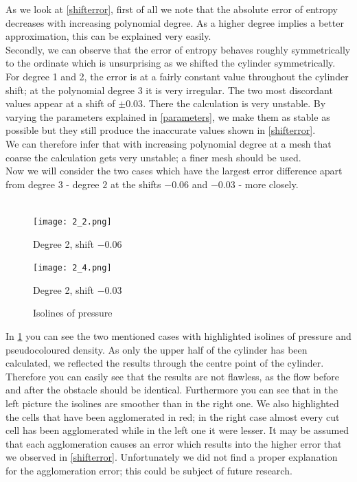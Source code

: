 	As we look at \cref{shifterror}, first of all we note that the absolute error of entropy decreases with increasing polynomial degree. As a higher  degree implies a better approximation, this can be explained very easily. \\ \indent
	Secondly, we can observe that the error of entropy behaves roughly symmetrically to the ordinate which is unsurprising as we shifted the cylinder symmetrically.\\ \indent
	For degree 1 and 2, the error is at a fairly constant value throughout the cylinder shift; at the polynomial degree 3 it is very irregular. The two most discordant values appear at a shift of $\pm 0.03$. There the calculation is very unstable. By varying the parameters explained in \cref{parameters}, we make them as stable as possible but they still produce the inaccurate values shown in \cref{shifterror}. \\ \indent
	We can therefore infer that with increasing polynomial degree at a mesh that coarse the calculation gets very unstable; a finer mesh should be used. \\ \indent
	Now we will consider the two cases which have the largest error difference apart from degree 3 - degree $2$ at the shifts $-0.06$ and $-0.03$ - more closely. \\\\
	
	\begin{figure}[htp]
		\centering
		\begin{minipage}[b]{0.5\textwidth}
			\centering
			\texttt{[image: 2\_2.png]}
			\caption*{Degree 2, shift $-0.06$}
			\label{fig:2_2}
		\end{minipage}%
		\begin{minipage}[b]{0.5\textwidth}
			\centering
			\texttt{[image: 2\_4.png]}
			\caption*{Degree 2, shift $-0.03$}
			\label{fig:2_4}
		\end{minipage}
		\caption{Isolines of pressure}\label{fig:isoshift}
	\end{figure}
	
	In \cref{fig:isoshift} you can see the two mentioned cases with highlighted isolines of pressure and pseudocoloured density. As only the upper half of the cylinder has been calculated, we reflected the results through the centre point of the cylinder. Therefore you can easily see that the results are not flawless, as the flow before and after the obstacle should be identical. Furthermore you can see that in the left picture the isolines are smoother than in the right one. We also highlighted the cells that have been agglomerated in red; in the right case almost every cut cell has been agglomerated while in the left one it were lesser. It may be assumed that each agglomeration causes an error which results into the higher error that we observed in \cref{shifterror}. Unfortunately we did not find a proper explanation for the agglomeration error; this could be subject of future research. \\\\ 
	
